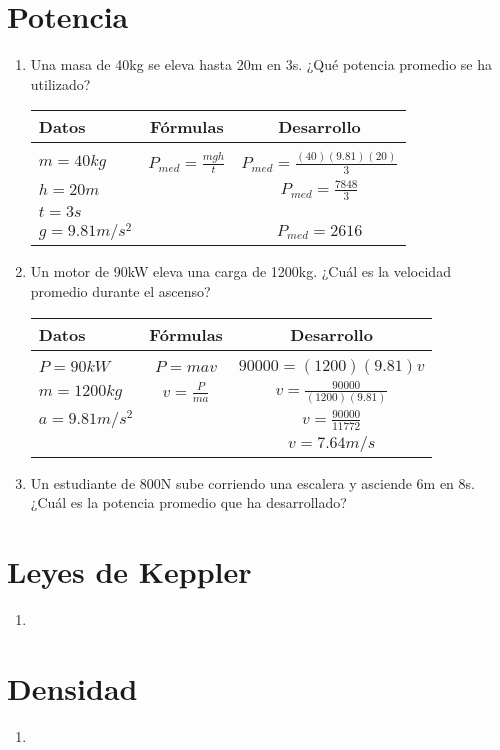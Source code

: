 \documentclass[11pt]{article} %
\begin{document}
\section{Potencia}
\begin{enumerate}
\item Una masa de 40kg se eleva hasta 20m en 3s. ¿Qué potencia promedio se ha utilizado?\\
\begin{tabular}{lcc}
Datos & Fórmulas & Desarrollo\\
\hline\\
$m = 40 kg$ & $P_{med} = \frac{mgh}{t} $ & $P_{med} = \frac{(40)(9.81)(20)}{3}$\\
$h = 20 m$ & & $P_{med} = \frac{7848}{3}$\\
$t = 3 s$ & & \\
$g = 9.81 m/s^2$ & & $P_{med} = 2616 $
\end{tabular}

\item Un motor de 90kW eleva una carga de 1200kg. ¿Cuál es la velocidad promedio durante el ascenso?\\
\begin{tabular}{lcc}
Datos & Fórmulas & Desarrollo\\
\hline\\
$P = 90kW$ & $P = mav$ & $90000 = (1200)(9.81)v$ \\
$m = 1200 kg$ & $v = \frac{P}{ma}$ & $v = \frac{90000}{(1200)(9.81)}$ \\
$a = 9.81m/s^2$ & & $v = \frac{90000}{11772}$ \\
& & $v = 7.64 m/s$ \\
\end{tabular}

\item Un estudiante de 800N sube corriendo una escalera y asciende 6m en 8s. ¿Cuál es la potencia promedio que ha desarrollado?
\end{enumerate}
\section{Leyes de Keppler}
\begin{enumerate}
\item
\end{enumerate}
\section{Densidad}
\begin{enumerate}
\item
\end{enumerate}
\end{document}
